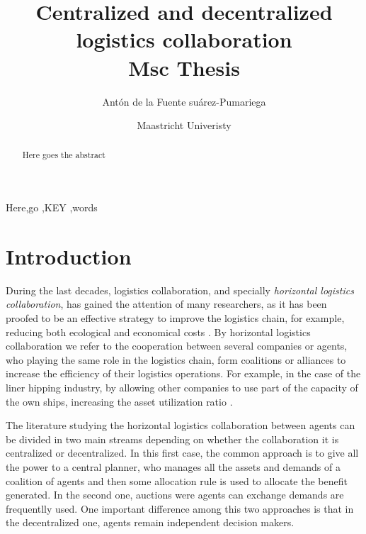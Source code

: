 \documentclass[review]{elsarticle}
\begin{document}
\begin{frontmatter}

\title{Centralized and decentralized logistics collaboration \\[5pt]
                \normalsize{Msc Thesis}}

\author{Antón de la Fuente suárez-Pumariega}
\address{a.delafuentesuarez-pumariega@student.maastrichtuniverisry.nl }

\author{Maastricht Univeristy}



\begin{abstract}
Here goes the abstract
\end{abstract}

\begin{keyword}
Here\sep go \sep KEY \sep words
\end{keyword}

\end{frontmatter}


\section{Introduction}

During the last decades, logistics collaboration, and specially \emph{horizontal
logistics collaboration}, has gained the attention of many researchers, as it
has been proofed to be an effective strategy to improve the logistics chain, for
example, reducing both ecological and economical 
costs \cite{BALLOT2010} \cite{SOYSAL2018168}. By horizontal logistics collaboration we refer to the
cooperation between several companies or agents, who playing the same role in
the logistics chain, form coalitions or alliances to increase the efficiency of
their logistics operations. For example, in the case of the liner hipping
industry, by allowing other companies to use part of the capacity of the own
ships, increasing the asset utilization ratio \cite{AGARWAL2008175}.

The literature studying the horizontal logistics collaboration between agents
can be divided in two main streams depending on whether the collaboration it is
centralized or decentralized. In this first case, the common approach is to give all the power to a central planner, who manages all the assets and demands of a coalition of agents and then some allocation rule is used to allocate the benefit generated. In the second one, auctions were agents can exchange demands are frequentlly used. One important difference among this two approaches is that in the decentralized one, agents remain independent decision makers.
\end{document}
